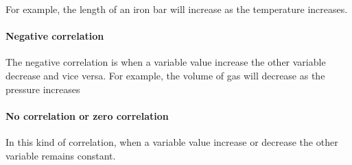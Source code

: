 \documentclass[]{article}
\begin{document}
For example, the length of an iron bar will increase as the temperature increases.

\paragraph{Negative correlation}
The negative correlation is when a variable value increase the other variable decrease and vice versa. 
For example, the volume of gas will decrease as the pressure increases

\paragraph{No correlation or zero correlation}
In this kind of correlation, when a variable value increase or decrease the other variable remains constant.
\end{document}
